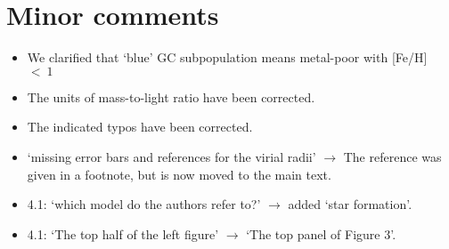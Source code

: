\documentclass{article}
\begin{document}
\section*{Minor comments}
\begin{itemize}
\item We clarified that `blue' GC subpopulation means metal-poor with [Fe/H]~$<~1$
\item The units of mass-to-light ratio have been corrected.
\item The indicated typos have been corrected.
\item `missing error bars and references for the virial radii' $\rightarrow$
    The reference was given in a footnote, but is now moved to the main text.
\item 4.1: `which model do the authors refer to?' $\rightarrow$ 
    added `star formation'.
\item 4.1: `The top half of the left figure' $\rightarrow$ 
    `The top panel of Figure 3'.
\end{itemize}
\end{document}
